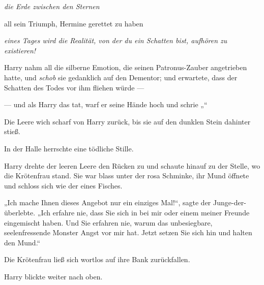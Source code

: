\emph{die Erde zwischen den Sternen}

all sein Triumph, Hermine gerettet zu haben

\emph{eines Tages wird die Realität, von der du ein Schatten bist, aufhören zu existieren!}

Harry nahm all die silberne Emotion, die seinen Patronus-Zauber angetrieben hatte, und \emph{schob} sie gedanklich auf den Dementor; und erwartete, dass der Schatten des Todes vor ihm fliehen würde —

— und als Harry das tat, warf er seine Hände hoch und schrie „“

Die Leere wich scharf von Harry zurück, bis sie auf den dunklen Stein dahinter stieß.

In der Halle herrschte eine tödliche Stille.

Harry drehte der leeren Leere den Rücken zu und schaute hinauf zu der Stelle, wo die Krötenfrau stand. Sie war blass unter der rosa Schminke, ihr Mund öffnete und schloss sich wie der eines Fisches.

„Ich mache Ihnen dieses Angebot nur ein einziges Mal!“, sagte der Junge-der-überlebte.
„Ich erfahre nie, dass Sie sich in bei mir oder einem meiner Freunde eingemischt haben. Und Sie erfahren nie, warum das unbesiegbare, seelenfressende Monster Angst vor mir hat. Jetzt setzen Sie sich hin und halten den Mund.“

Die Krötenfrau ließ sich wortlos auf ihre Bank zurückfallen.

Harry blickte weiter nach oben.

